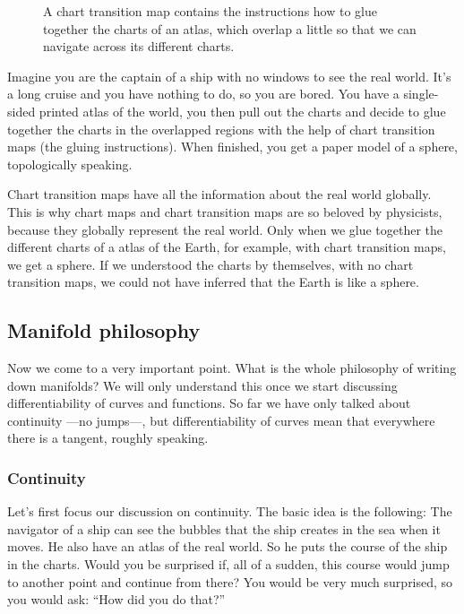 \begin{figure}[ht]
  \caption{A chart transition map contains the instructions how to glue together the charts
  of an atlas, which overlap a little so that we can navigate across its different charts.}
  \label{fig:mf-chart-transition-maps-two}
\end{figure}

Imagine you are the captain of a ship with no windows to see the real world. It's a long cruise and
you have nothing to do, so you are bored. You have a single-sided printed atlas of the world,
you then pull out the charts and decide to glue together the charts in the overlapped regions
with the help of chart transition maps (the gluing instructions). When finished, you get
a paper model of a sphere, topologically speaking.

Chart transition maps have all the information about the real world globally.
This is why chart maps and chart transition maps are so beloved by physicists, because they
globally represent the real world.
Only when we glue together the different charts of a atlas of the Earth, for example,  with chart
transition maps, we get a sphere. If we understood the charts by themselves, with no chart transition
maps, we could not have inferred that the Earth is like a sphere.

\subsection{Manifold philosophy}
Now we come to a very important point. What is the whole philosophy of writing down manifolds?
We will only understand this once we start discussing differentiability of curves and functions.
So far we have only talked about continuity ---no jumps---, but differentiability of curves mean
that everywhere there is a tangent, roughly speaking.

\subsubsection{Continuity}
Let's first focus our discussion on continuity.
The basic idea is the following:
The navigator of a ship can see the bubbles that the ship creates in the sea when it moves.
He also have an atlas of the real world. So he puts the course of the ship in the charts.
Would you be surprised if, all of a sudden, this course would jump to another point and
continue from there? You would be very much surprised, so you would ask: ``How did you do that?''

